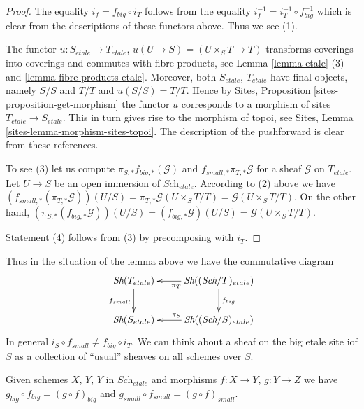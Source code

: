 \begin{proof}
The equality $i_f = f_{big} \circ i_T$ follows from the
equality $i_f^{-1} = i_T^{-1} \circ f_{big}^{-1}$ which is
clear from the descriptions of these functors above.
Thus we see (1).

\medskip\noindent
The functor $u : S_{etale} \to T_{etale}$, $u(U \to S) = (U \times_S T \to T)$
transforms coverings into coverings and commutes with fibre products,
see Lemma \ref{lemma-etale} (3) and \ref{lemma-fibre-products-etale}.
Moreover, both $S_{etale}$, $T_{etale}$ have final objects, namely
$S/S$ and $T/T$ and $u(S/S) = T/T$. Hence by
Sites, Proposition \ref{sites-proposition-get-morphism}
the functor $u$ corresponds to a morphism of sites
$T_{etale} \to S_{etale}$. This in turn gives rise to the morphism
of topoi, see
Sites, Lemma \ref{sites-lemma-morphism-sites-topoi}. The description
of the pushforward is clear from these references.

\medskip\noindent
To see (3) let us compute $\pi_{S, *}f_{big, *}(\mathcal{G})$ and
$f_{small, *} \pi_{T, *}\mathcal{G}$ for a sheaf $\mathcal{G}$ on
$T_{etale}$. Let $U \to S$ be an open
immersion of $\textit{Sch}_{etale}$. According to
(2) above we have $(f_{small, *}(\pi_{T, *}\mathcal{G}))(U/S) =
\pi_{T, *}\mathcal{G}(U \times_S T/T) = \mathcal{G}(U\times_S T/T)$.
On the other hand,
$(\pi_{S, *}(f_{big, *}\mathcal{G}))(U/S) =
(f_{big, *}\mathcal{G})(U/S) =
\mathcal{G}(U\times_S T/T)$.

\medskip\noindent
Statement (4) follows from (3) by precomposing with $i_T$.
\end{proof}

\noindent
Thus in the situation of the lemma above we have the commutative diagram
$$
\xymatrix{
\textit{Sh}(T_{etale}) \ar[d]_{f_{small}} &
\textit{Sh}((\textit{Sch}/T)_{etale}) \ar[d]^{f_{big}} \ar[l]^{\pi_T}\\
\textit{Sh}(S_{etale}) &
\textit{Sh}((\textit{Sch}/S)_{etale}) \ar[l]_{\pi_S}
}
$$
In general $i_S \circ f_{small} \not = f_{big} \circ i_T$.
We can think about a sheaf on the big etale site iof $S$ as a collection
of ``usual'' sheaves on all schemes over $S$.

\begin{lemma}
\label{lemma-composition-etale}
Given schemes $X$, $Y$, $Y$ in $\textit{Sch}_{etale}$
and morphisms $f : X \to Y$, $g : Y \to Z$ we have
$g_{big} \circ f_{big} = (g \circ f)_{big}$ and
$g_{small} \circ f_{small} = (g \circ f)_{small}$.
\end{lemma}

